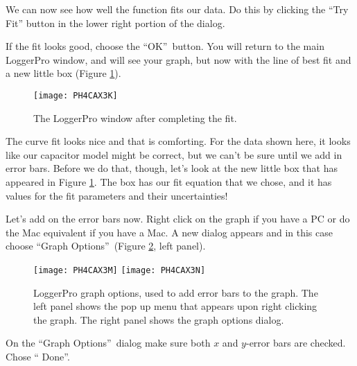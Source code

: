 We can now see
how well the function fits our data. Do this by clicking the ``Try Fit'' button
in the lower right portion of the dialog. 

If the fit looks good, choose the \textquotedblleft OK\textquotedblright\
button. You will return to the main LoggerPro window, and will see your
graph, but now with the line of best fit and a new little box
(Figure \ref{fig:fitcomplete}). 
\begin{figure}[tbp!]
	\centering
\texttt{[image: PH4CAX3K]}
	\caption[The LoggerPro window after completing the fit]{The LoggerPro
	window after completing the fit.} 
	\label{fig:fitcomplete}
\end{figure}
The curve fit looks nice and that
is comforting. For the data shown here, 
it looks like our capacitor model might be
correct, but we can't be sure until we add in error bars. Before we do that,
though,
let's look at the new little box that has appeared in Figure \ref{fig:fitcomplete}. 
The box has our fit equation that
we chose, and it has values for the fit parameters and their uncertainties!

Let's add on the error bars now. Right click on the graph if you have a PC
or do the Mac equivalent if you have a Mac. A new dialog appears and in this
case choose \textquotedblleft Graph Options\textquotedblright\ 
(Figure \ref{fig:graphopts}, left panel).
\begin{figure}[tbp!]
	\centering
\texttt{[image: PH4CAX3M]}
\texttt{[image: PH4CAX3N]}
	\caption[LoggerPro graph options]{LoggerPro graph options, used to
	add error bars to the graph. The left panel shows the pop up menu
	that appears upon right clicking the graph. The right panel shows the
	graph options dialog.}
	\label{fig:graphopts}
\end{figure}%
On the \textquotedblleft Graph Options\textquotedblright\ dialog make sure
both $x$ and $y$-error bars are checked.
Chose \textquotedblleft
Done\textquotedblright. 

